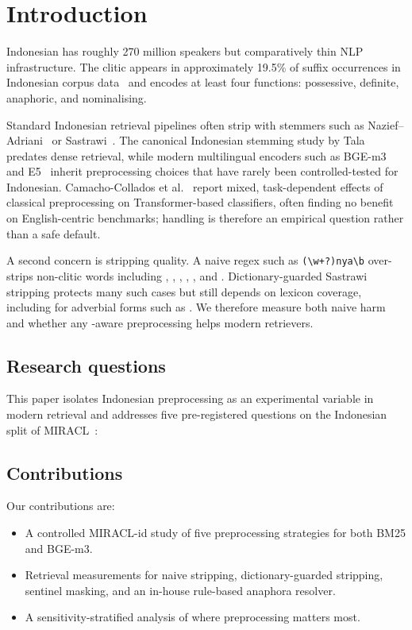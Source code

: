 \section{Introduction}
\label{sec:introduction}

Indonesian has roughly 270 million speakers but comparatively thin NLP infrastructure. The clitic  appears in approximately 19.5\% of suffix occurrences in Indonesian corpus data~\cite{denistia2021morphology} and encodes at least four functions: possessive, definite, anaphoric, and nominalising.

Standard Indonesian retrieval pipelines often strip  with stemmers such as Nazief--Adriani~\cite{nazief1996indonesian} or Sastrawi~\cite{sastrawi}. The canonical Indonesian stemming study by Tala~\cite{tala2003stemming} predates dense retrieval, while modern multilingual encoders such as BGE-m3~\cite{chen2024bgem3} and E5~\cite{wang2024multilingual_e5} inherit preprocessing choices that have rarely been controlled-tested for Indonesian. Camacho-Collados et al.~\cite{camacho2023preprocessing} report mixed, task-dependent effects of classical preprocessing on Transformer-based classifiers, often finding no benefit on English-centric benchmarks;  handling is therefore an empirical question rather than a safe default.

A second concern is stripping quality. A naive regex such as \texttt{(\textbackslash w+?)nya\textbackslash b} over-strips non-clitic words including , , , , , and . Dictionary-guarded Sastrawi stripping protects many such cases but still depends on lexicon coverage, including for adverbial forms such as . We therefore measure both naive harm and whether any -aware preprocessing helps modern retrievers.

\subsection{Research questions}

This paper isolates Indonesian  preprocessing as an experimental variable in modern retrieval and addresses five pre-registered questions on the Indonesian split of MIRACL~\cite{zhang2023miracl}:



\subsection{Contributions}

Our contributions are:

\begin{itemize}
    \item A controlled MIRACL-id study of five  preprocessing strategies for both BM25 and BGE-m3.
    \item Retrieval measurements for naive stripping, dictionary-guarded stripping, sentinel masking, and an in-house rule-based anaphora resolver.
    \item A sensitivity-stratified analysis of where  preprocessing matters most.
\end{itemize}
